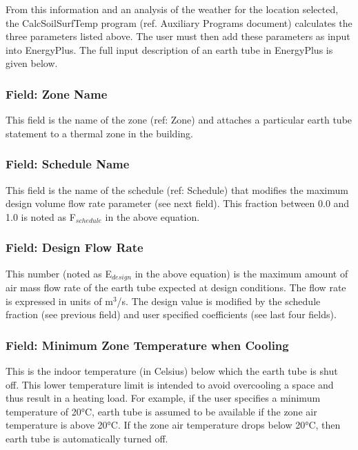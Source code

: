 From this information and an analysis of the weather for the location selected, the CalcSoilSurfTemp program (ref. Auxiliary Programs document) calculates the three parameters listed above. The user must then add these parameters as input into EnergyPlus. The full input description of an earth tube in EnergyPlus is given below.

\subsubsection{Field: Zone Name}\label{field-zone-name-5}

This field is the name of the zone (ref: Zone) and attaches a particular earth tube statement to a thermal zone in the building.

\subsubsection{Field: Schedule Name}\label{field-schedule-name-6}

This field is the name of the schedule (ref: Schedule) that modifies the maximum design volume flow rate parameter (see next field). This fraction between 0.0 and 1.0 is noted as F\(_{schedule}\) in the above equation.

\subsubsection{Field: Design Flow Rate}\label{field-design-flow-rate-4}

This number (noted as E\(_{design}\) in the above equation) is the maximum amount of air mass flow rate of the earth tube expected at design conditions. The flow rate is expressed in units of m\(^{3}\)/s. The design value is modified by the schedule fraction (see previous field) and user specified coefficients (see last four fields).

\subsubsection{Field: Minimum Zone Temperature when Cooling}\label{field-minimum-zone-temperature-when-cooling}

This is the indoor temperature (in Celsius) below which the earth tube is shut off. This lower temperature limit is intended to avoid overcooling a space and thus result in a heating load. For example, if the user specifies a minimum temperature of 20°C, earth tube is assumed to be available if the zone air temperature is above 20°C. If the zone air temperature drops below 20°C, then earth tube is automatically turned off.


